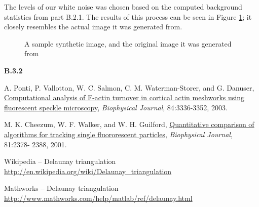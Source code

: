 \documentclass{article}
\begin{document}
The levels of our white noise was chosen based on the computed background statistics from part B.2.1. The results of this process can be seen in Figure \ref{fig:syntheticImage}; it closely resembles the actual image it was generated from.

\begin{figure}[h]
\centering
\caption{A sample synthetic image, and the original image it was generated from}
\label{fig:syntheticImage}
\end{figure}


\textbf{B.3.2}



\pagebreak
\begin{thebibliography}{9}
\fontsize{10pt}{12pt}\selectfont
\raggedright

        A. Ponti, P. Vallotton, W. C. Salmon, C. M. Waterman-Storer, and G.
        Danuser, \ul{Computational analysis of F-actin turnover in cortical
        actin meshworks using fluorescent speckle microscopy}, {\em Biophysical
        Journal}, 84:3336-3352, 2003.

        M. K. Cheezum, W. F. Walker, and W. H. Guilford, 
        \ul{Quantitative comparison of algorithms for tracking single 
        fluororescent particles}, {\em Biophysical Journal}, 81:2378- 2388, 2001.

        Wikipedia -- Delaunay triangulation
        \url{http://en.wikipedia.org/wiki/Delaunay_triangulation}
    
        Mathworks -- Delaunay triangulation
        \url{http://www.mathworks.com/help/matlab/ref/delaunay.html}

\end{thebibliography}


\end{document}
